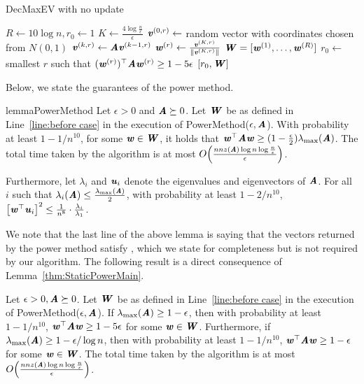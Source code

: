 \begin{algorithm}
\caption{{\sc DecMaxEV} with no update}\label{alg:PowerMethod}
 \begin{algorithmic}[1]
\State $R \leftarrow 10\log n, r_0 \leftarrow 1$
\State $K \leftarrow \frac{4\log \frac{n}{\epsilon}}{\epsilon}$
\State $\vv^{(0,r)} \leftarrow $ random vector with coordinates chosen from $N(0,1)$\label{algline:randomInit}
\State $\vv^{(k,r)}\leftarrow \AA\vv^{(k-1,r)}$
\EndFor
\State $\ww^{(r)} \leftarrow \frac{\vv^{(K,r)}}{\|\vv^{(K,r)}\|}$ 
\EndFor
\State $\WW = [\ww^{(1)},\dots,\ww^{(R)}]$\label{line:before case}
\label{line: if all w 1-eps}
\State {}
\Else
\State $r_0\leftarrow$ smallest $r$ such that $(\ww^{(r)})^{\top}\AA\ww^{(r)} \geq 1-5\epsilon$
\State \Return $[r_0,\WW]$
\EndIf
\EndProcedure 
 \end{algorithmic}
\end{algorithm}
%
%
Below, we state the guarantees of the power method.

\begin{restatable}{lemma}{PowerMethod}\label{thm:StaticPowerMain}
Let $\epsilon>0$ and $\AA \succeq 0$. Let $\WW$ be as defined in Line~\ref{line:before case} in the execution of {\sc PowerMethod}($\epsilon,\AA$). With probability at least $1-1/n^{10}$, for some $\ww \in \WW$, it holds that $\ww^{\top}\AA\ww \geq (1-\frac{\epsilon}{2})\lambda_{\max}(\AA)$. The total time taken by the algorithm is at most $O\left(\frac{nnz(\AA)\log n\log \frac{n}{\epsilon}}{\epsilon}\right)$.

Furthermore, let $\lambda_i$ and $\uu_i$ denote the eigenvalues and eigenvectors of $\AA$. For all $i$ such that $\lambda_i (\AA) \leq \frac{\lambda_{\max}(\AA)}{2}$, with probability at least $1-2/n^{10}$, $\left[\ww^{\top}\uu_i\right]^2\leq \frac{1}{n^8}\cdot \frac{\lambda_i}{\lambda_1}$.
\end{restatable}
 We note that the last line of the above lemma is saying that the vectors returned by the power method satisfy , which we state for completeness but is not required by our algorithm. The following result is a direct consequence of Lemma~\ref{thm:StaticPowerMain}.

 \begin{corollary}\label{thm:StaticPower}
 Let $\epsilon>0, \AA \succeq 0$. Let $\WW$ be as defined in Line~\ref{line:before case} in the execution of {\sc PowerMethod}($\epsilon,\AA$). If $\lambda_{\max}(\AA) \ge 1-\epsilon$, then with probability at least $1-1/n^{10}$, $\ww^{\top}\AA\ww\geq 1-5\epsilon$ for some $\ww\in \WW$. Furthermore, if $\lambda_{\max}(\AA) \ge 1-\epsilon/\log n$, then with probability at least $1-1/n^{10}$, $\ww^{\top}\AA\ww\geq 1-\epsilon$ for some $\ww\in \WW$. The total time taken by the algorithm is at most $O\left(\frac{nnz(\AA)\log n\log \frac{n}{\epsilon}}{\epsilon}\right)$.
 \end{corollary}

